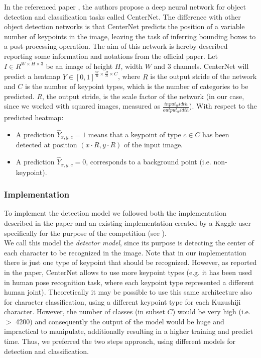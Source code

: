 In the referenced paper \cite{Zhou2019-sd}, the authors propose a deep neural network for object detection and classification tasks called CenterNet. The difference with other object detection networks is that CenterNet predicts the position of a variable number of keypoints in the image, leaving the task of inferring bounding boxes to a post-processing operation. The aim of this network is hereby described reporting some information and notations from the official paper. Let $I \in R^{W \times H \times 3}$ be an image of height $H$, width $W$ and 3 channels. CenterNet will predict a heatmap  $Y \in [0,1]^{\frac{W}{R} \times \frac{H}{R} \times C}$, where $R$ is the output stride of the network and $C$ is the number of keypoint types, which is the number of categories to be predicted. $R$, the output stride, is the scale factor of the network (in our case, since we worked with squared images, measured as $\frac{input_width}{output_width}$). With respect to the predicted heatmap:

\begin{itemize}
	\item A prediction $\widehat{Y}_{x,y,c}=1$ means that a keypoint of type $c \in C$ has been detected at position $(x\cdot R, y\cdot R)$ of the input image.
	\item A prediction $\widehat{Y}_{x,y,c}=0$, corresponds to a background point (i.e. non-keypoint).
\end{itemize}

\subsubsection{Implementation}
\label{sssec:implementationdet}

To implement the detection model we followed both the implementation described in the paper and an existing implementation created by a Kaggle user specifically for the purpose of the competition (see \cite{k-mat2019}).\\ We call this model the \textit{detector model}, since its purpose is detecting the center of each character to be recognized in the image. Note that in our implementation there is just one type of keypoint that should be recognized. However, as reported in the paper, CenterNet allows to use more keypoint types (e.g. it has been used in human pose recognition task, where each keypoint type represented a different human joint). Theoretically it may be possible to use this same architecture also for character classification, using a different keypoint type for each Kuzushiji character. However, the number of classes (in subset $C$) would be very high (i.e. $>$ 4200) and consequently the output of the model would be huge and impractical to manipulate, additionally resulting in a higher training and predict time. Thus, we preferred the two steps approach, using different models for detection and classification.

